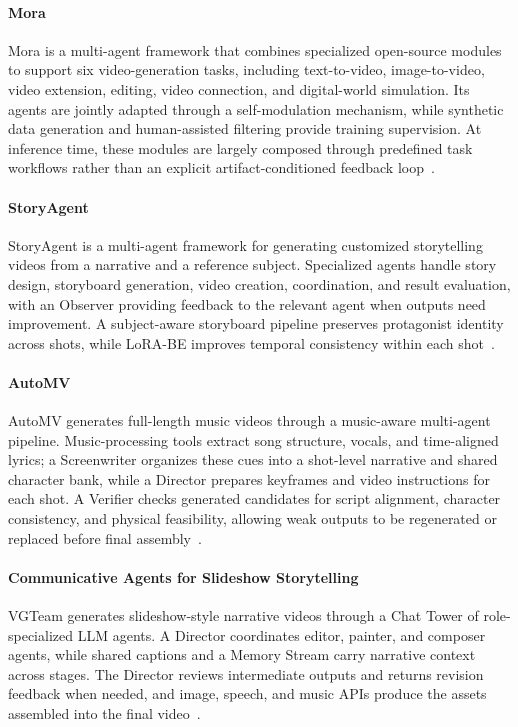 \paragraph{Mora}
Mora is a multi-agent framework that combines specialized open-source modules to support six video-generation tasks, including text-to-video, image-to-video, video extension, editing, video connection, and digital-world simulation. Its agents are jointly adapted through a self-modulation mechanism, while synthetic data generation and human-assisted filtering provide training supervision. At inference time, these modules are largely composed through predefined task workflows rather than an explicit artifact-conditioned feedback loop~\cite{yuan2024mora}.

\paragraph{StoryAgent}
StoryAgent is a multi-agent framework for generating customized storytelling videos from a narrative and a reference subject. Specialized agents handle story design, storyboard generation, video creation, coordination, and result evaluation, with an Observer providing feedback to the relevant agent when outputs need improvement. A subject-aware storyboard pipeline preserves protagonist identity across shots, while LoRA-BE improves temporal consistency within each shot~\cite{avg241104925}.

\paragraph{AutoMV}
AutoMV generates full-length music videos through a music-aware multi-agent pipeline. Music-processing tools extract song structure, vocals, and time-aligned lyrics; a Screenwriter organizes these cues into a shot-level narrative and shared character bank, while a Director prepares keyframes and video instructions for each shot. A Verifier checks generated candidates for script alignment, character consistency, and physical feasibility, allowing weak outputs to be regenerated or replaced before final assembly~\cite{avg251212196}.

\paragraph{Communicative Agents for Slideshow Storytelling}
VGTeam generates slideshow-style narrative videos through a Chat Tower of role-specialized LLM agents. A Director coordinates editor, painter, and composer agents, while shared captions and a Memory Stream carry narrative context across stages. The Director reviews intermediate outputs and returns revision feedback when needed, and image, speech, and music APIs produce the assets assembled into the final video~\cite{avg250901277}.

